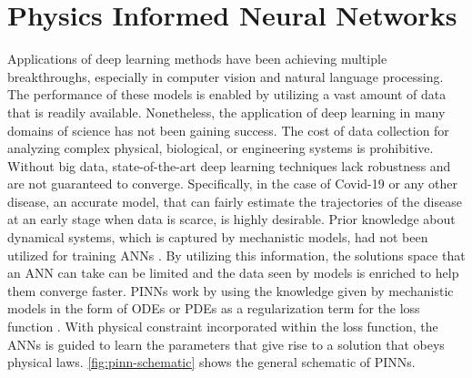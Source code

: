 \section{Physics Informed Neural Networks}
\label{sec:literature-review-physics-informed-neural-network}

Applications of deep learning methods have been achieving multiple breakthroughs, especially in computer vision and natural language processing.
The performance of these models is enabled by utilizing a vast amount of data that is readily available.
Nonetheless, the application of deep learning in many domains of science has not been gaining success.
The cost of data collection for analyzing complex physical, biological, or engineering systems is prohibitive.
Without big data, state-of-the-art deep learning techniques lack robustness and are not guaranteed to converge.
Specifically, in the case of Covid-19 or any other disease, an accurate model, that can fairly estimate the trajectories of the disease at an early stage when data is scarce, is highly desirable.
Prior knowledge about dynamical systems, which is captured by mechanistic models, had not been utilized for training \glspl{ANN} \cite{raissiPhysicsinformedNeuralNetworks2019}.
By utilizing this information, the solutions space that an \gls{ANN} can take can be limited and the data seen by models is enriched to help them converge faster.
\glspl{PINN} work by using the knowledge given by mechanistic models in the form of \glspl{ODE} or \glspl{PDE} as a regularization term for the loss function \cite{raissiPhysicsinformedNeuralNetworks2019, lagarisArtificialNeuralNetworks1998}.
With physical constraint incorporated within the loss function, the \glspl{ANN} is guided to learn the parameters that give rise to a solution that obeys physical laws.
\autoref{fig:pinn-schematic} shows the general schematic of \glspl{PINN}.


